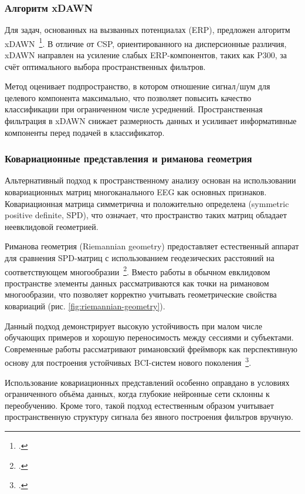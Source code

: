 \subsubsection*{Алгоритм xDAWN}

Для задач, основанных на вызванных потенциалах (ERP), предложен алгоритм xDAWN~\footcite{10.1109/tbme.2009.2012869}. В отличие от CSP, ориентированного на дисперсионные различия, xDAWN направлен на усиление слабых ERP-компонентов, таких как P300, за счёт оптимального выбора пространственных фильтров.

Метод оценивает подпространство, в котором отношение сигнал/шум для целевого компонента максимально, что позволяет повысить качество классификации при ограниченном числе усреднений. Пространственная фильтрация в xDAWN снижает размерность данных и усиливает информативные компоненты перед подачей в классификатор.

\subsubsection*{Ковариационные представления и риманова геометрия}

Альтернативный подход к пространственному анализу основан на использовании ковариационных матриц многоканального EEG как основных признаков. Ковариационная матрица симметрична и положительно определена (symmetric positive definite, SPD), что означает, что пространство таких матриц обладает неевклидовой геометрией.

Риманова геометрия (Riemannian geometry) предоставляет естественный аппарат для сравнения SPD-матриц с использованием геодезических расстояний на соответствующем многообразии~\footcite{10.1080/2326263x.2017.1297192}. Вместо работы в обычном евклидовом пространстве элементы данных рассматриваются как точки на римановом многообразии, что позволяет корректно учитывать геометрические свойства ковариаций (рис. \ref{fig:riemannian-geometry}).

Данный подход демонстрирует высокую устойчивость при малом числе обучающих примеров и хорошую переносимость между сессиями и субъектами. Современные работы рассматривают римановский фреймворк как перспективную основу для построения устойчивых BCI-систем нового поколения~\footcite{10.48550/ARXIV.1310.8115}. 

Использование ковариационных представлений особенно оправдано в условиях ограниченного объёма данных, когда глубокие нейронные сети склонны к переобучению. Кроме того, такой подход естественным образом учитывает пространственную структуру сигнала без явного построения фильтров вручную.

